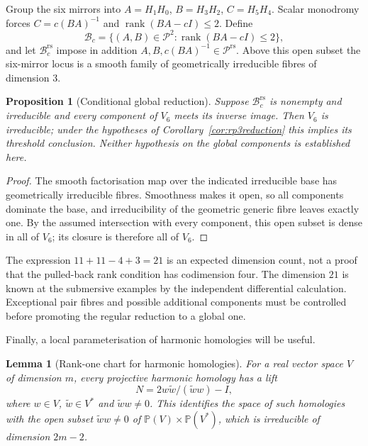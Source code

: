 \documentclass[11pt,a4paper]{article}
\theoremstyle{plain}
\newtheorem{lemma}[theorem]{Lemma}
\newtheorem{proposition}[theorem]{Proposition}
\theoremstyle{definition}
\theoremstyle{remark}
\begin{document}
Group the six mirrors into $A=H_1H_0$, $B=H_3H_2$, $C=H_5H_4$.
Scalar monodromy forces $C=c(BA)^{-1}$ and
$\operatorname{rank}(BA-cI)\le2$. Define
\[
 \mathcal B_c=\{(A,B)\in\mathcal P^2:
                   \operatorname{rank}(BA-cI)\le2\},
\]
and let $\mathcal B_c^{\mathrm{rs}}$ impose in addition
$A,B,c(BA)^{-1}\in\mathcal P^{\mathrm{rs}}$.
Above this open subset the six-mirror locus is a smooth family of
geometrically irreducible fibres of dimension $3$.

\begin{proposition}[Conditional global reduction]\label{prop:v6reduce}
Suppose $\mathcal B_c^{\mathrm{rs}}$ is nonempty and irreducible and every
component of $V_6$ meets its inverse image. Then $V_6$ is irreducible;
under the hypotheses of Corollary~\ref{cor:rp3reduction} this implies its
threshold conclusion. Neither hypothesis on the global components is
established here.
\end{proposition}

\begin{proof}
The smooth factorisation map over the indicated irreducible base has
geometrically irreducible fibres. Smoothness makes it open, so all components
dominate the base, and irreducibility of the geometric generic fibre leaves
exactly one. By the assumed intersection with every component, this open
subset is dense in all of $V_6$; its closure is therefore all of $V_6$.
\end{proof}

The expression $11+11-4+3=21$ is an expected dimension count, not a proof
that the pulled-back rank condition has codimension four. The dimension
$21$ is known at the submersive examples by the independent differential
calculation. Exceptional pair fibres and possible additional components
must be controlled before promoting the regular reduction to a global one.

Finally, a local parameterisation of harmonic homologies will be useful.

\begin{lemma}[Rank-one chart for harmonic homologies]\label{lem:invchart}
For a real vector space $V$ of dimension $m$, every projective harmonic homology
has a lift
\[
             N=2w\tilde w/(\tilde w w)-I,
\]
where $w\in V$, $\tilde w\in V^*$ and $\tilde w w\ne0$. This identifies the
space of such homologies with the open subset $\tilde w w\ne0$ of
$\mathbb P(V)\times\mathbb P(V^*)$, which is irreducible of dimension
$2m-2$.
\end{lemma}
\end{document}
